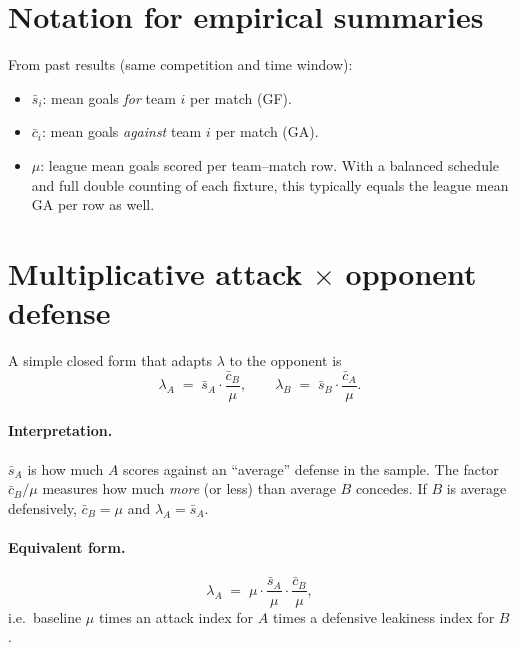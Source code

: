 \documentclass[11pt,a4paper]{article}
\begin{document}
\section{Notation for empirical summaries}
\label{sec:notation}

From past results (same competition and time window):
\begin{itemize}
  \item $\bar{s}_i$: mean goals \emph{for} team $i$ per match (GF).
  \item $\bar{c}_i$: mean goals \emph{against} team $i$ per match (GA).
  \item $\mu$: league mean goals scored per team--match row. With a balanced schedule and full double counting of each fixture, this typically equals the league mean GA per row as well.
\end{itemize}

\section{Multiplicative attack $\times$ opponent defense}
\label{sec:product}

A simple closed form that adapts $\lambda$ to the opponent is
\begin{equation}
  \lambda_A \;=\; \bar{s}_A \cdot \frac{\bar{c}_B}{\mu},
  \qquad
  \lambda_B \;=\; \bar{s}_B \cdot \frac{\bar{c}_A}{\mu}.
  \label{eq:product}
\end{equation}

\paragraph{Interpretation.}
$\bar{s}_A$ is how much $A$ scores against an ``average'' defense in the sample.
The factor $\bar{c}_B/\mu$ measures how much \emph{more} (or less) than average $B$ concedes.
If $B$ is average defensively, $\bar{c}_B = \mu$ and $\lambda_A = \bar{s}_A$.

\paragraph{Equivalent form.}
\begin{equation*}
  \lambda_A \;=\; \mu \cdot \frac{\bar{s}_A}{\mu} \cdot \frac{\bar{c}_B}{\mu},
\end{equation*}
i.e.\ baseline $\mu$ times an attack index for $A$ times a defensive leakiness index for $B$.
\end{document}
